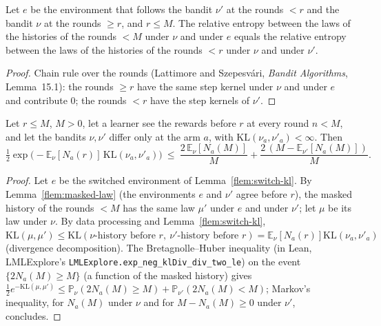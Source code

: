 \documentclass[11pt]{article}
\newcommand{\E}{\mathbb{E}}
\newcommand{\PP}{\mathbb{P}}
\newcommand{\KL}{\mathrm{KL}}
\begin{document}
\begin{lemma}\label{flem:switch-kl}
Let $e$ be the environment that follows the bandit $\nu'$ at the rounds $<r$ and the bandit $\nu$
at the rounds $\ge r$, and $r\le M$. The relative entropy between the laws of the histories of the
rounds $<M$ under $\nu$ and under $e$ equals the relative entropy between the laws of the histories
of the rounds $<r$ under $\nu$ and under $\nu'$.
\end{lemma}

\begin{proof}
Chain rule over the rounds (Lattimore and Szepesv\'ari, \emph{Bandit Algorithms}, Lemma~15.1): the rounds $\ge r$ have the same step kernel
under $\nu$ and under $e$ and contribute $0$; the rounds $<r$ have the step kernels of $\nu'$.
\end{proof}

\begin{lemma}\label{flem:onebatch-finite}
Let $r\le M$, $M>0$, let a learner see the rewards before $r$ at every round $n<M$, and let the
bandits $\nu,\nu'$ differ only at the arm $a$, with $\KL(\nu_a,\nu'_a)<\infty$. Then
\[
\tfrac12\exp\big(-\E_\nu[N_a(r)]\,\KL(\nu_a,\nu'_a)\big)
\ \le\ \frac{2\,\E_\nu[N_a(M)]}{M}+\frac{2\,(M-\E_{\nu'}[N_a(M)])}{M}.
\]
\end{lemma}

\begin{proof}
Let $e$ be the switched environment of Lemma~\ref{flem:switch-kl}. By
Lemma~\ref{flem:masked-law} (the environments $e$ and $\nu'$ agree before $r$), the masked history
of the rounds $<M$ has the same law $\mu'$ under $e$ and under $\nu'$; let $\mu$ be its law under
$\nu$. By data processing and Lemma~\ref{flem:switch-kl},
$\KL(\mu,\mu')\le\KL(\nu\text{-history before }r,\ \nu'\text{-history before }r)
=\E_\nu[N_a(r)]\KL(\nu_a,\nu'_a)$ (divergence decomposition). The Bretagnolle--Huber inequality
(in Lean, LMLExplore's \texttt{LMLExplore.exp\_neg\_klDiv\_div\_two\_le}) on the event $\{2N_a(M)\ge M\}$ (a function of the masked history) gives
$\tfrac12e^{-\KL(\mu,\mu')}\le\PP_\nu(2N_a(M)\ge M)+\PP_{\nu'}(2N_a(M)<M)$; Markov's inequality,
for $N_a(M)$ under $\nu$ and for $M-N_a(M)\ge0$ under $\nu'$, concludes.
\end{proof}
\end{document}
